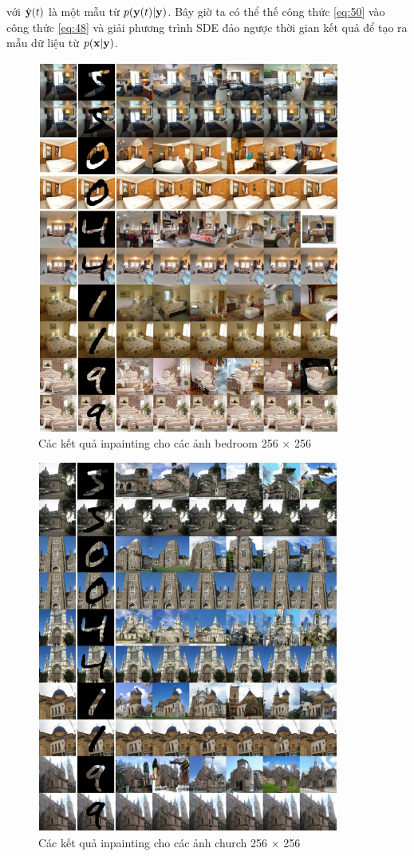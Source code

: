 \documentclass{article} %
\begin{document}
với $\hat{\bold{y}}(t)$ là một mẫu từ $p(\bold{y}(t) \vert \bold{y})$.
Bây giờ ta có thể thế công thức \ref{eq:50} vào công thức \ref{eq:48} và giải phương trình SDE đảo ngược thời gian kết quả để tạo ra mẫu dữ liệu từ $p(\bold{x} \vert \bold{y})$.

\begin{figure}[h!]
    \centering
    \includegraphics[width=0.8\linewidth]{figures/14.png}
    \caption{Các kết quả inpainting cho các ảnh bedroom 256 $\times$ 256}
    \label{fig:14}
\end{figure}

\begin{figure}[h!]
    \centering
    \includegraphics[width=0.8\linewidth]{figures/15.png}
    \caption{Các kết quả inpainting cho các ảnh church 256 $\times$ 256}
    \label{fig:15}
\end{figure}
\end{document}
